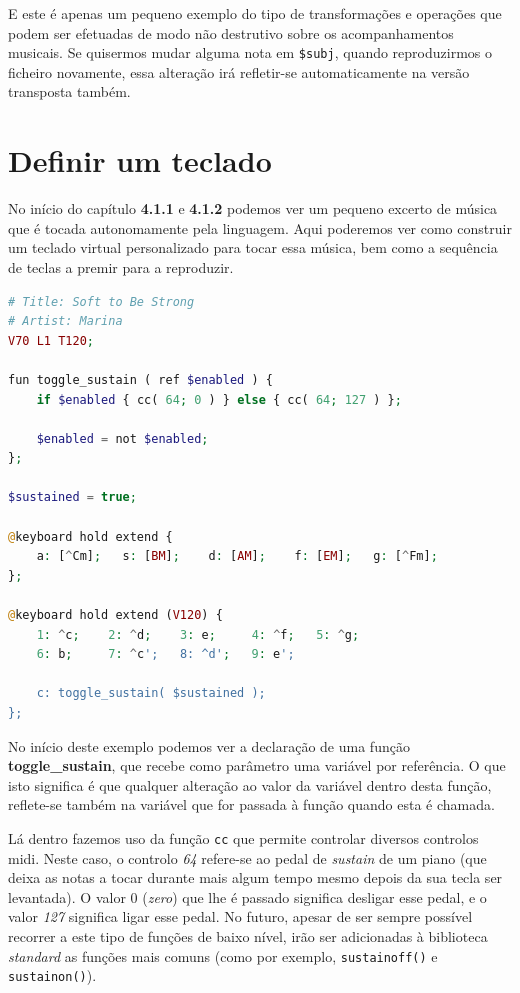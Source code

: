 E este é apenas um pequeno exemplo do tipo de transformações e operações que podem ser efetuadas de modo não destrutivo sobre os acompanhamentos musicais. Se quisermos mudar alguma nota em \texttt{\$subj}, quando reproduzirmos o ficheiro novamente, essa alteração irá refletir-se automaticamente na versão transposta também.

\section{Definir um teclado}

No início do capítulo \textbf{4.1.1} e \textbf{4.1.2} podemos ver um pequeno excerto de música que é tocada autonomamente pela linguagem. Aqui poderemos ver como construir um teclado virtual personalizado para tocar essa música, bem como a sequência de teclas a premir para a reproduzir.
    
\begin{lstlisting}[caption=Exemplo da sintaxe para criação de teclados,language=PHP]
# Title: Soft to Be Strong
# Artist: Marina
V70 L1 T120;

fun toggle_sustain ( ref $enabled ) {
    if $enabled { cc( 64; 0 ) } else { cc( 64; 127 ) };

    $enabled = not $enabled;
};

$sustained = true;

@keyboard hold extend {
    a: [^Cm];   s: [BM];    d: [AM];    f: [EM];   g: [^Fm];
};

@keyboard hold extend (V120) {
    1: ^c;    2: ^d;    3: e;     4: ^f;   5: ^g;
    6: b;     7: ^c';   8: ^d';   9: e';

    c: toggle_sustain( $sustained );
};
\end{lstlisting}

No início deste exemplo podemos ver a declaração de uma função \textbf{toggle\_sustain}, que recebe como parâmetro uma variável por referência. O que isto significa é que qualquer alteração ao valor da variável dentro desta função, reflete-se também na variável que for passada à função quando esta é chamada. 

Lá dentro fazemos uso da função \texttt{cc} que permite controlar diversos controlos \acrshort{midi}. Neste caso, o controlo \textit{64} refere-se ao pedal de \textit{sustain} de um piano (que deixa as notas a tocar durante mais algum tempo mesmo depois da sua tecla ser levantada). O valor 0 (\textit{zero}) que lhe é passado significa desligar esse pedal, e o valor \textit{127} significa ligar esse pedal. No futuro, apesar de ser sempre possível recorrer a este tipo de funções de baixo nível, irão ser adicionadas à biblioteca \textit{standard} as funções mais comuns (como por exemplo, \texttt{sustainoff()} e \texttt{sustainon()}).

